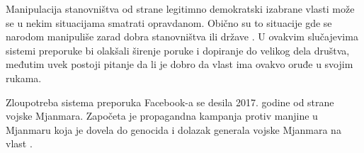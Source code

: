 \documentclass[a4paper]{article}
\begin{document}
Manipulacija stanovništva od strane legitimno demokratski izabrane vlasti može se u nekim situacijama smatrati opravdanom. Obično su to situacije gde se narodom manipuliše zarad dobra stanovništva ili države \cite{Genovesi_Kaesling_Robbins_2023}. U ovakvim slučajevima sistemi preporuke bi olakšali širenje poruke i dopiranje do velikog dela društva, međutim uvek postoji pitanje da li je dobro da vlast ima ovakvo oruđe u svojim rukama.

Zloupotreba sistema preporuka Facebook-a se desila 2017. godine od strane vojske Mjanmara. Započeta je propagandna kampanja protiv manjine u Mjanmaru koja je dovela do genocida i dolazak generala vojske Mjanmara na vlast \cite{Reports_2018}.


\appendix


\appendix
\end{document}
